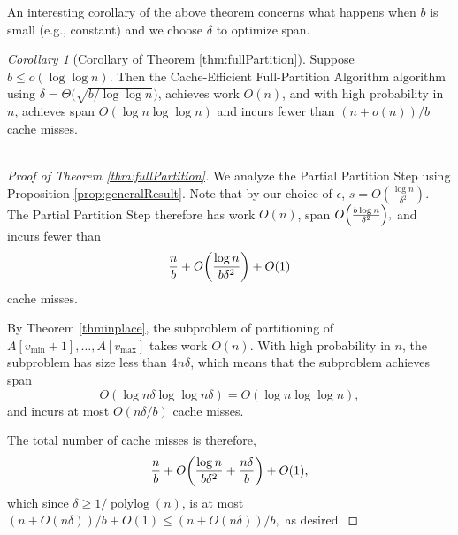 \documentclass[sigplan, 10pt, nonacm]{acmart}
\DeclarePairedDelimiter{\paren}{(}{)}
\newcommand{\polylog}{\operatorname{polylog}}
\theoremstyle{remark}
\newtheorem{corollary}[thm]{Corollary}
\theoremstyle{remark}
\begin{document}

An interesting corollary of the above theorem concerns what happens when $b$ is small (e.g., constant) and we choose $\delta$ to optimize span. 

\begin{corollary}[Corollary of Theorem \ref{thm:fullPartition}]
	\label{cor:fullPartition}
Suppose $b \le o(\log \log n)$. Then the Cache-Efficient Full-Partition Algorithm algorithm using $\delta = \Theta\big(\sqrt{b/\log\log n}\big)$, achieves work $O(n)$, and with high probability in $n$, achieves span $O(\log n \log\log n)$ and incurs fewer than $(n+o(n))/b$ cache misses.\\\\
\end{corollary}

\begin{proof}[Proof of Theorem \ref{thm:fullPartition}]
  
  We analyze the Partial Partition Step using Proposition
  \ref{prop:generalResult}. Note that by our choice of $\epsilon$,
  $s=O\left(\frac{\log n}{\delta^2}\right)$.  The Partial Partition
  Step therefore has work $O(n)$, span $O\paren*{\frac{b\log
      n}{\delta^2}},$ and incurs fewer than
	$$\frac{n}{b}+O\paren*{\frac{\log n}{b\delta^2}}+O(1)$$ 
  cache misses.

  By Theorem \ref{thminplace}, the subproblem of partitioning of \\ $A[v_{\text{min}} + 1], \ldots,
   A[v_{\text{max}}]$ takes work $O(n)$. With high probability in $n$,
  the subproblem has size less than $4n\delta$, which means that the subproblem
  achieves span
  $$O(\log n\delta \log\log n\delta) = O(\log n \log\log n),$$
  and incurs at most $O(n \delta / b)$ cache misses.

  The total number of cache misses is therefore,
  	$$\frac{n}{b}+O\paren*{\frac{\log n}{b\delta^2} +
    \frac{n\delta}{b}}+O(1),$$ which since $\delta \ge 1 /
  \polylog(n)$, is at most $(n+O(n\delta))/b + O(1) \le (n + O(n
  \delta)) / b,$ as desired.
\end{proof}
\end{document}
